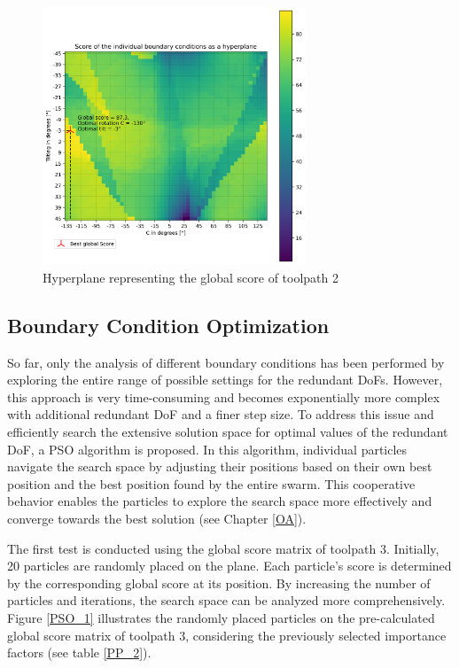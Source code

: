 \begin{figure}[H]
	\centerline{\includegraphics[width=0.7\textwidth]{figures/best_2D_2.png}}
	\caption{Hyperplane representing the global score of toolpath 2}
	\label{best_2D_2}
\end{figure}


\newpage
\subsection{Boundary Condition Optimization }
So far, only the analysis of different boundary conditions has been performed by exploring the entire range of possible settings for the redundant \acrshort{DoF}s. However, this approach is very time-consuming and becomes exponentially more complex with additional redundant \acrshort{DoF} and a finer step size. To address this issue and efficiently search the extensive solution space for optimal values of the redundant \acrshort{DoF}, a \acrshort{PSO} algorithm is proposed. In this algorithm, individual particles navigate the search space by adjusting their positions based on their own best position and the best position found by the entire swarm. This cooperative behavior enables the particles to explore the search space more effectively and converge towards the best solution (see Chapter \ref{OA}).

The first test is conducted using the global score matrix of toolpath 3. Initially, 20 particles are randomly placed on the plane. Each particle's score is determined by the corresponding global score at its position. By increasing the number of particles and iterations, the search space can be analyzed more comprehensively. Figure \ref{PSO_1} illustrates the randomly placed particles on the pre-calculated global score matrix of toolpath 3, considering the previously selected importance factors (see table \ref{PP_2}).

